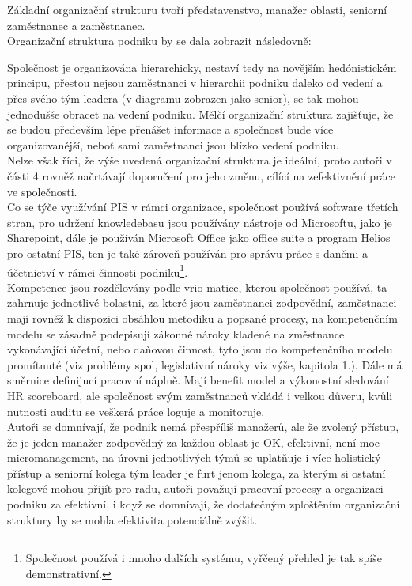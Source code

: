 Základní organizační strukturu tvoří představenstvo, manažer oblasti, seniorní zaměstnanec a zaměstnanec.\\

Organizační struktura podniku by se dala zobrazit následovně:\\


Společnost je organizována hierarchicky, nestaví tedy na novějším hedónistickém principu, přestou nejsou zaměstnanci v hierarchii podniku daleko od vedení a přes svého tým leadera (v diagramu zobrazen jako senior), se tak mohou jednodušše obracet na vedení podniku. Mělčí organizační struktura zajišťuje, že se budou především lépe přenášet informace a společnost bude více organizovanější, neboť sami zaměstnanci jsou blízko vedení podniku.\\

Nelze však říci, že výše uvedená organizační struktura je ideální, proto autoři v části 4 rovněž načrtávají doporučení pro jeho změnu, cílící na zefektivnění práce ve společnosti.\\

Co se týče využívání PIS v rámci organizace, společnost používá software třetích stran, pro udržení knowledebasu jsou používány nástroje od Microsoftu, jako je Sharepoint, dále je používán Microsoft Office jako office suite a program Helios pro ostatní PIS, ten je také zároveň používán pro správu práce s daněmi a účetnictví v rámci činnosti podniku\footnote{Společnost používá i mnoho dalších systému, vyřčený přehled je tak spíše demonstrativní.}.\\

Kompetence jsou rozdělovány podle vrio matice, kterou společnost používá, ta zahrnuje jednotlivé bolastni, za které jsou zaměstnanci zodpovědní, zaměstnanci mají rovněž k dispozici obsáhlou metodiku a popsané procesy, na kompetenčním modelu se zásadně podepisují zákonné nároky kladené na změstnance vykonávající účetní, nebo daňovou činnost, tyto jsou do kompetenčního modelu promítnuté (viz problémy spol, legislativní nároky viz výše, kapitola 1.). Dále má směrnice definijucí pracovní náplně. Mají benefit model a výkonostní sledování HR scoreboard, ale společnost svým zaměstnanců vkládá i velkou důveru, kvůli nutnosti auditu se veškerá práce loguje a monitoruje.\\

Autoři se domnívají, že podnik nemá přespříliš manažerů, ale že zvolený přístup, že je jeden manažer zodpovědný za každou oblast je OK, efektivní, není moc micromanagement, na úrovni jednotlivých týmů se uplatňuje i více holistický přístup a seniorní kolega tým leader je furt jenom kolega, za kterým si ostatní kolegové mohou přijít pro radu, autoři považují pracovní procesy a organizaci podniku za efektivní, i když se domnívají, že dodatečným zploštěním organizační struktury by se mohla efektivita potenciálně zvýšit.\\


